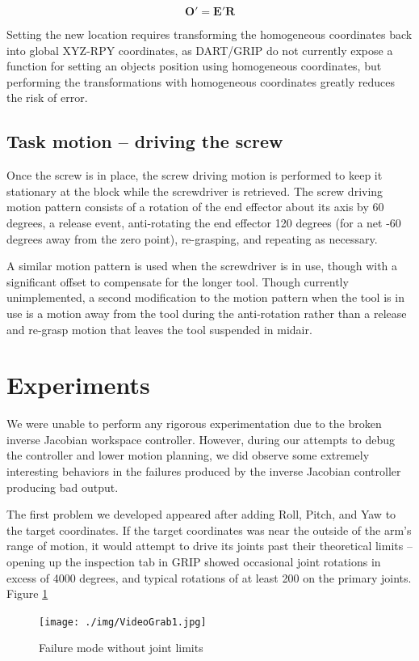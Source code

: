 \documentclass[10pt, conference]{IEEEtran}
\begin{document}
   \begin{equation}\label{eq:affineup}
   \mathbf{O'} = \mathbf{E'}\mathbf{R}
   \end{equation}

   Setting the new location requires transforming the homogeneous
   coordinates back into global XYZ-RPY coordinates, as DART/GRIP do not
   currently expose a function for setting an objects position using
   homogeneous coordinates, but performing the transformations with
   homogeneous coordinates greatly reduces the risk of error.
\subsection{Task motion -- driving the screw}
\label{sec-3-6}

   Once the screw is in place, the screw driving motion is performed to
   keep it stationary at the block while the screwdriver is
   retrieved. The screw driving motion pattern consists of a rotation of
   the end effector about its axis by 60 degrees, a release event,
   anti-rotating the end effector 120 degrees (for a net -60 degrees
   away from the zero point), re-grasping, and repeating as necessary.

   A similar motion pattern is used when the screwdriver is in use,
   though with a significant offset to compensate for the longer
   tool. Though currently unimplemented, a second modification to the
   motion pattern when the tool is in use is a motion away from the tool
   during the anti-rotation rather than a release and re-grasp motion
   that leaves the tool suspended in midair.
\section{Experiments}
\label{sec-4}

  We were unable to perform any rigorous experimentation due to the
  broken inverse Jacobian workspace controller. However, during our
  attempts to debug the controller and lower motion planning, we did
  observe some extremely interesting behaviors in the failures produced
  by the inverse Jacobian controller producing bad output.

  The first problem we developed appeared after adding Roll, Pitch, and Yaw to
  the target coordinates. If the target coordinates was near the outside
  of the arm's range of motion, it would attempt to drive its joints
  past their theoretical limits -- opening up the inspection tab in GRIP
  showed occasional joint rotations in excess of \textpm{} 4000 degrees, and
  typical rotations of at least \textpm{} 200 on the primary joints. Figure \ref{fig:nojoints}
  \begin{figure}[htb]
  \centering
  \texttt{[image: ./img/VideoGrab1.jpg]}
  \caption{\label{fig:nojoints}Failure mode without joint limits}
  \end{figure}
\end{document}
